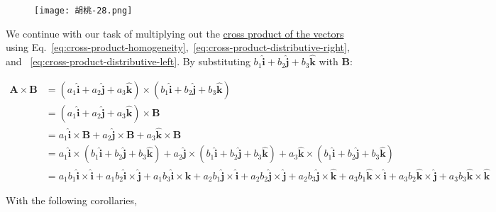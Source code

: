 \begin{figure}[H]
    \begin{flushright}
        \texttt{[image: 胡桃-28.png]}
    \end{flushright}
\end{figure}

We continue with our task of multiplying out the \hyperref[eq:cross-product-of-two]{cross product of the vectors} using
Eq.~\ref{eq:cross-product-homogeneity},~\ref{eq:cross-product-distributive-right}, and ~\ref{eq:cross-product-distributive-left}.
By substituting $b_1\boldsymbol{\hat{i}} + b_2\boldsymbol{\hat{j}} + b_3\boldsymbol{\hat{k}}$ with $\boldsymbol{B}$:

\begin{align}
    \boldsymbol{A} \times \boldsymbol{B} &= (a_1\boldsymbol{\hat{i}} + a_2\boldsymbol{\hat{j}} + a_3\boldsymbol{\hat{k}}) \times (b_1\boldsymbol{\hat{i}} + b_2\boldsymbol{\hat{j}} + b_3\boldsymbol{\hat{k}}) \\
    &= (a_1\boldsymbol{\hat{i}} + a_2\boldsymbol{\hat{j}} + a_3\boldsymbol{\hat{k}}) \times \boldsymbol{B}\label{eq:cross-product-assumed-distributivity} \\
    &= a_1\boldsymbol{\hat{i}} \times \boldsymbol{B} + a_2\boldsymbol{\hat{j}} \times \boldsymbol{B} + a_3\boldsymbol{\hat{k}} \times \boldsymbol{B} \\
    &= a_1\boldsymbol{\hat{i}} \times (b_1\boldsymbol{\hat{i}} + b_2\boldsymbol{\hat{j}} + b_3\boldsymbol{\hat{k}}) + a_2\boldsymbol{\hat{j}} \times (b_1\boldsymbol{\hat{i}} + b_2\boldsymbol{\hat{j}} + b_3\boldsymbol{\hat{k}}) + a_3\boldsymbol{\hat{k}} \times (b_1\boldsymbol{\hat{i}} + b_2\boldsymbol{\hat{j}} + b_3\boldsymbol{\hat{k}}) \\
    &= a_1 b_1 \boldsymbol{\hat{i}} \times \boldsymbol{\hat{i}} + a_1 b_2 \boldsymbol{\hat{i}} \times \boldsymbol{\hat{j}} + a_1 b_3 \boldsymbol{\hat{i}} \times \boldsymbol{\hat{k}} + a_2 b_1 \boldsymbol{\hat{j}} \times \boldsymbol{\hat{i}} + a_2 b_2 \boldsymbol{\hat{j}} \times \boldsymbol{\hat{j}} + a_2 b_3 \boldsymbol{\hat{j}} \times \boldsymbol{\hat{k}} + a_3 b_1 \boldsymbol{\hat{k}} \times \boldsymbol{\hat{i}} + a_3 b_2 \boldsymbol{\hat{k}} \times \boldsymbol{\hat{j}} + a_3 b_3 \boldsymbol{\hat{k}} \times \boldsymbol{\hat{k}}\label{eq:cross-product-complete-expand}
\end{align}

With the following corollaries,

